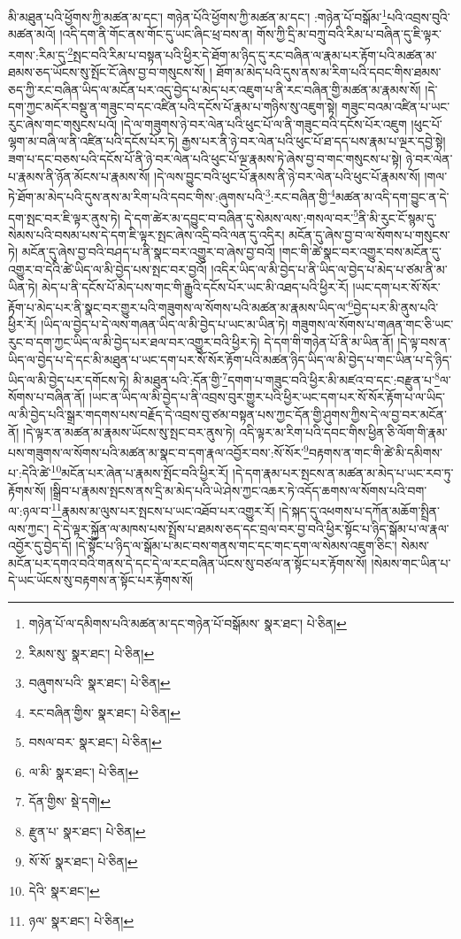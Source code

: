 མི་མཐུན་པའི་ཕྱོགས་ཀྱི་མཚན་མ་དང་། གཉེན་པོའི་ཕྱོགས་ཀྱི་མཚན་མ་དང་། :གཉེན་པོ་བསྒོམ་\footnote{གཉེན་པོ་ལ་དམིགས་པའི་མཚན་མ་དང་གཉེན་པོ་བསྒོམས་  སྣར་ཐང་།  པེ་ཅིན། }པའི་འབྲས་བུའི་མཚན་མའོ། །འདི་དག་ནི་གོང་ནས་གོང་དུ་ཡང་ཞིང་ཕྲ་བས་ན། གོས་ཀྱི་དྲི་མ་བཀྲུ་བའི་རིམ་པ་བཞིན་དུ་ཇི་ལྟར་རགས་:རིམ་དུ་\footnote{རིམས་སུ་  སྣར་ཐང་།  པེ་ཅིན། }སྤང་བའི་རིམ་པ་བསྟན་པའི་ཕྱིར་དེ་ཐོག་མ་ཉིད་དུ་རང་བཞིན་ལ་རྣམ་པར་རྟོག་པའི་མཚན་མ་ཐམས་ཅད་ཡོངས་སུ་སྤོང་ངོ་ཞེས་བྱ་བ་གསུངས་སོ། །
ཐོག་མ་མེད་པའི་དུས་ནས་མ་རིག་པའི་དབང་གིས་ཐམས་ཅད་ཀྱི་རང་བཞིན་ཡིད་ལ་མངོན་པར་འདུ་བྱེད་པ་མེད་པར་འཇུག་པ་ནི་རང་བཞིན་གྱི་མཚན་མ་རྣམས་སོ། །དེ་དག་ཀྱང་མདོར་བསྡུ་ན་གཟུང་བ་དང་འཛིན་པའི་དངོས་པོ་རྣམ་པ་གཉིས་སུ་འཇུག་སྟེ། གཟུང་བའམ་འཛིན་པ་ཡང་རུང་ཞེས་གང་གསུངས་པའོ། །དེ་ལ་གཟུགས་ཉེ་བར་ལེན་པའི་ཕུང་པོ་ལ་ནི་གཟུང་བའི་དངོས་པོར་འཇུག །ཕུང་པོ་ལྷག་མ་བཞི་ལ་ནི་འཛིན་པའི་དངོས་པོར་ཏེ། རྒྱས་པར་ནི་ཉེ་བར་ལེན་པའི་ཕུང་པོ་ཐ་དད་པས་རྣམ་པ་ལྔར་དབྱེ་སྟེ། ཟག་པ་དང་བཅས་པའི་དངོས་པོ་ནི་ཉེ་བར་ལེན་པའི་ཕུང་པོ་ལྔ་རྣམས་ཏེ་ཞེས་བྱ་བ་གང་གསུངས་པ་སྟེ། ཉེ་བར་ལེན་པ་རྣམས་ནི་ཉོན་མོངས་པ་རྣམས་སོ། །དེ་ལས་བྱུང་བའི་ཕུང་པོ་རྣམས་ནི་ཉེ་བར་ལེན་པའི་ཕུང་པོ་རྣམས་སོ། །གལ་ཏེ་ཐོག་མ་མེད་པའི་དུས་ནས་མ་རིག་པའི་དབང་གིས་:ཞུགས་པའི་\footnote{བཞུགས་པའི་  སྣར་ཐང་།  པེ་ཅིན། }:རང་བཞིན་གྱི་\footnote{རང་བཞིན་གྱིས་  སྣར་ཐང་།  པེ་ཅིན། }མཚན་མ་འདི་དག་བྱུང་ན་དེ་དག་སྤང་བར་ཇི་ལྟར་ནུས་ཏེ། དེ་དག་ཚེར་མ་དབྱུང་བ་བཞིན་དུ་སེམས་ལས་:གསལ་བར་\footnote{བསལ་བར་  སྣར་ཐང་།  པེ་ཅིན། }ནི་མི་རུང་ངོ་སྙམ་དུ་སེམས་པའི་བསམ་པས་དེ་དག་ཇི་ལྟར་སྤང་ཞེས་འདྲི་བའི་ལན་དུ་འདིར། མངོན་དུ་ཞེས་བྱ་བ་ལ་སོགས་པ་གསུངས་ཏེ། མངོན་དུ་ཞེས་བྱ་བའི་བཤད་པ་ནི་སྣང་བར་འགྱུར་བ་ཞེས་བྱ་བའོ། །གང་གི་ཚེ་སྣང་བར་འགྱུར་བས་མངོན་དུ་འགྱུར་བ་དེའི་ཚེ་ཡིད་ལ་མི་བྱེད་པས་སྤང་བར་བྱའོ། །འདིར་ཡིད་ལ་མི་བྱེད་པ་ནི་ཡིད་ལ་བྱེད་པ་མེད་པ་ཙམ་ནི་མ་ཡིན་ཏེ། མེད་པ་ནི་དངོས་པོ་མེད་པས་གང་གི་རྒྱུའི་དངོས་པོར་ཡང་མི་འཐད་པའི་ཕྱིར་རོ། །ཡང་དག་པར་སོ་སོར་རྟོག་པ་མེད་པར་ནི་སྣང་བར་གྱུར་པའི་གཟུགས་ལ་སོགས་པའི་མཚན་མ་རྣམས་ཡིད་ལ་\footnote{ལ་མི་  སྣར་ཐང་།  པེ་ཅིན། }བྱེད་པར་མི་ནུས་པའི་ཕྱིར་རོ། །ཡིད་ལ་བྱེད་པ་དེ་ལས་གཞན་ཡིད་ལ་མི་བྱེད་པ་ཡང་མ་ཡིན་ཏེ། གཟུགས་ལ་སོགས་པ་གཞན་གང་ཅི་ཡང་རུང་བ་དག་ཀྱང་ཡིད་ལ་མི་བྱེད་པར་ཐལ་བར་འགྱུར་བའི་ཕྱིར་ཏེ། དེ་དག་གི་གཉེན་པོ་ནི་མ་ཡིན་ནོ། །དེ་ལྟ་བས་ན་ཡིད་ལ་བྱེད་པ་དེ་དང་མི་མཐུན་པ་ཡང་དག་པར་སོ་སོར་རྟོག་པའི་མཚན་ཉིད་ཡིད་ལ་མི་བྱེད་པ་གང་ཡིན་པ་དེ་ཉིད་ཡིད་ལ་མི་བྱེད་པར་དགོངས་ཏེ། མི་མཐུན་པའི་:དོན་གྱི་\footnote{དོན་གྱིས་  སྡེ་དགེ། }དགག་པ་གཟུང་བའི་ཕྱིར་མི་མཛའ་བ་དང་:བརྫུན་པ་\footnote{རྫུན་པ་  སྣར་ཐང་།  པེ་ཅིན། }ལ་སོགས་པ་བཞིན་ནོ། །ཡང་ན་ཡིད་ལ་མི་བྱེད་པ་ནི་འབྲས་བུར་གྱུར་པའི་ཕྱིར་ཡང་དག་པར་སོ་སོར་རྟོག་པ་ལ་ཡིད་ལ་མི་བྱེད་པའི་སྒྲར་གདགས་པས་བརྗོད་དེ་འབྲས་བུ་ཙམ་བསྟན་པས་ཀྱང་དོན་གྱི་ཤུགས་ཀྱིས་དེ་ལ་བྱ་བར་མངོན་ནོ། །དེ་ལྟར་ན་མཚན་མ་རྣམས་ཡོངས་སུ་སྤང་བར་ནུས་ཏེ། འདི་ལྟར་མ་རིག་པའི་དབང་གིས་ཕྱིན་ཅི་ལོག་གི་རྣམ་པས་གཟུགས་ལ་སོགས་པའི་མཚན་མ་སྣང་བ་དག་རྣལ་འབྱོར་བས་:སོ་སོར་\footnote{སོ་སོ་  སྣར་ཐང་།  པེ་ཅིན། }བརྟགས་ན་གང་གི་ཚེ་མི་དམིགས་པ་:དེའི་ཚེ་\footnote{དེའི་  སྣར་ཐང་། }མངོན་པར་ཞེན་པ་རྣམས་སྤོང་བའི་ཕྱིར་རོ། །དེ་དག་རྣམ་པར་སྤངས་ན་མཚན་མ་མེད་པ་ཡང་རབ་ཏུ་རྟོགས་སོ། །སྒྲིབ་པ་རྣམས་སྤངས་ནས་དྲི་མ་མེད་པའི་ཡེ་ཤེས་ཀྱང་འཆར་ཏེ་འདོད་ཆགས་ལ་སོགས་པའི་བག་ལ་:ཉལ་བ་\footnote{ཉལ་  སྣར་ཐང་།  པེ་ཅིན། }རྣམས་མ་ལུས་པར་སྤངས་པ་ཡང་འཐོབ་པར་འགྱུར་རོ། །དེ་སྐད་དུ་འཕགས་པ་དཀོན་མཆོག་སྤྲིན་ལས་ཀྱང་། དེ་དེ་ལྟར་སྐྱོན་ལ་མཁས་པས་སྤྲོས་པ་ཐམས་ཅད་དང་བྲལ་བར་བྱ་བའི་ཕྱིར་སྟོང་པ་ཉིད་སྒོམ་པ་ལ་རྣལ་འབྱོར་དུ་བྱེད་དོ། །དེ་སྟོང་པ་ཉིད་ལ་སྒོམ་པ་མང་བས་གནས་གང་དང་གང་དག་ལ་སེམས་འཇུག་ཅིང་། སེམས་མངོན་པར་དགའ་བའི་གནས་དེ་དང་དེ་ལ་རང་བཞིན་ཡོངས་སུ་བཙལ་ན་སྟོང་པར་རྟོགས་སོ། །སེམས་གང་ཡིན་པ་དེ་ཡང་ཡོངས་སུ་བརྟགས་ན་སྟོང་པར་རྟོགས་སོ། 